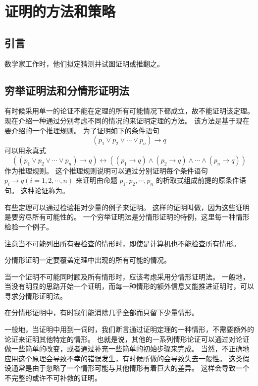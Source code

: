 
\section{证明的方法和策略}
{
    \subsection{引言}
    {
        数学家工作时，他们拟定猜测并试图证明或推翻之。
    }

    \subsection{穷举证明法和分情形证明法}
    {
        有时候采用单一的论证不能在定理的所有可能情况下都成立，故不能证明该定理。
        现在介绍一种通过分别考虑不同的情况的来证明定理的方法。
        该方法是基于现在要介绍的一个推理规则。
        为了证明如下的条件语句
        $$(p_1 \vee p_2 \vee \cdots \vee p_n) \rightarrow q$$
        可以用永真式
        $$((p_1 \vee p_2 \vee \cdots \vee p_n) \rightarrow q) \leftrightarrow ((p_1 \rightarrow q) \wedge (p_2 \rightarrow q) \wedge \cdots \wedge (p_n \rightarrow q))$$
        作为推理规则。
        这个推理规则说明可以通过分别证明每个条件语句 $p_i \rightarrow q(i = 1, 2, \cdots , n)$ 来证明由命题 $p_1, p_2, \cdots , p_n$ 的析取式组成前提的原条件语句。
        这种论证称为。

        {
            有些定理可以通过检验相对少量的例子来证明。
            这样的证明叫做，因为这些证明是要穷尽所有可能性的。
            一个穷举证明法是分情形证明的特例，这里每一种情形检验一个例子。

            注意当不可能列出所有要检查的情形时，即使是计算机也不能检查所有情形。
        }

        {
            分情形证明一定要覆盖定理中出现的所有可能的情况。
        }

        {
            当一个证明不可能同时顾及所有情形时，应该考虑采用分情形证明法。
            一般地，当没有明显的思路开始一个证明，而每一种情形的额外信息又能推进证明时，可以寻求分情形证明法。

            在分情形证明中，有时我们能消除几乎全部而只留下少量情形。
        }

        {
            一般地，当证明中用到一词时，我们断言通过证明定理的一种情形，不需要额外的论证来证明其他特定的情形。
            也就是说，其他的一系列情形论证可以通过对论证做一些简单的改变，或者通过补充一些简单的初始步骤来完成。
            当然，不正确地应用这个原理会导致不幸的错误发生，有时候所做的会导致失去一般性。
            这类假设通常是由于忽略了一个情形可能与其他情形有着巨大的差异。
            这样会导致一个不完整的或许不可补救的证明。
        }

}}
